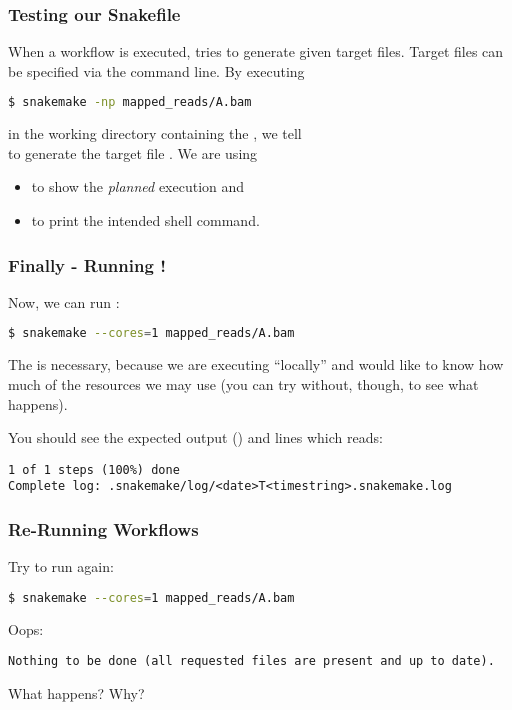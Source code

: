 \begin{frame}[fragile]
  \frametitle{Testing our Snakefile}
  When a workflow is executed, \Snakemake{} tries to generate given target files. Target files can be specified via the command line. By executing
  \begin{lstlisting}[language=Bash, style=Shell]
$ snakemake -np mapped_reads/A.bam
  \end{lstlisting}
  in the working directory containing the , we tell \\\Snakemake{} to generate the target file .\newline
  We are using 
  \begin{itemize}[<+->]
   \item {} to show the \emph{planned} execution and
   \item {} to print the intended shell command.
  \end{itemize} 
\end{frame}

\begin{frame}[fragile]
  \frametitle{Finally - Running \Snakemake{}!}
  Now, we can run \Snakemake{}:
  \begin{lstlisting}[language=Bash, style=Shell]
$ snakemake --cores=1 mapped_reads/A.bam
  \end{lstlisting}
  \begin{hint}[Note:]
  	The  is necessary, because we are executing ``locally'' and \Snakemake{} would like to know how much of the resources we may use (you can try without, though, to see what happens).
  \end{hint}
  You should see the expected output () and lines which reads:
  \begin{lstlisting}[style=Plain, basicstyle=\footnotesize]
1 of 1 steps (100%) done
Complete log: .snakemake/log/<date>T<timestring>.snakemake.log
  \end{lstlisting}
\end{frame}

\begin{frame}[fragile]
  \frametitle{Re-Running Workflows}
  Try to run \Snakemake{} again:
  \begin{lstlisting}[language=Bash, style=Shell]
$ snakemake --cores=1 mapped_reads/A.bam
  \end{lstlisting}
  \pause
  Oops:
  \begin{lstlisting}[style=Plain, basicstyle=\footnotesize]
Nothing to be done (all requested files are present and up to date).
  \end{lstlisting}
  \begin{question}
  	What happens? Why?
  \end{question}
\end{frame}

